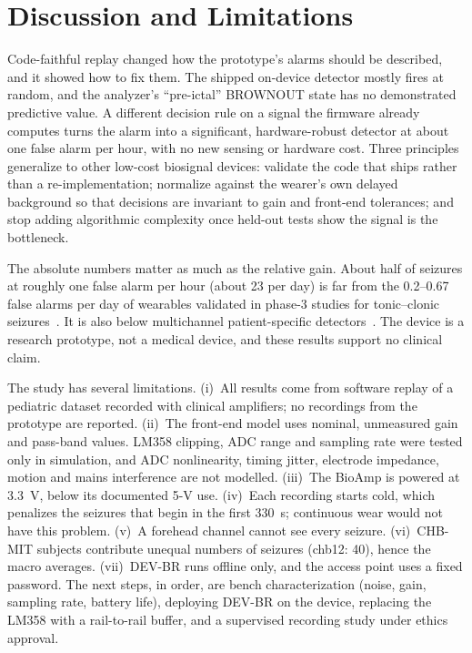 \documentclass[conference,letterpaper]{IEEEtran}
\begin{document}
\section{Discussion and Limitations}
Code-faithful replay changed how the prototype's alarms should be described, and it showed how to fix them. The shipped on-device detector mostly fires at random, and the analyzer's ``pre-ictal'' BROWNOUT state has no demonstrated predictive value. A different decision rule on a signal the firmware already computes turns the alarm into a significant, hardware-robust detector at about one false alarm per hour, with no new sensing or hardware cost. Three principles generalize to other low-cost biosignal devices: validate the code that ships rather than a re-implementation; normalize against the wearer's own delayed background so that decisions are invariant to gain and front-end tolerances; and stop adding algorithmic complexity once held-out tests show the signal is the bottleneck.

The absolute numbers matter as much as the relative gain. About half of seizures at roughly one false alarm per hour (about 23 per day) is far from the 0.2--0.67 false alarms per day of wearables validated in phase-3 studies for tonic--clonic seizures~\cite{beniczky2021guideline}. It is also below multichannel patient-specific detectors~\cite{shoeb2010icml}. The device is a research prototype, not a medical device, and these results support no clinical claim.

The study has several limitations. (i)~All results come from software replay of a pediatric dataset recorded with clinical amplifiers; no recordings from the prototype are reported. (ii)~The front-end model uses nominal, unmeasured gain and pass-band values. LM358 clipping, ADC range and sampling rate were tested only in simulation, and ADC nonlinearity, timing jitter, electrode impedance, motion and mains interference are not modelled. (iii)~The BioAmp is powered at 3.3~V, below its documented 5-V use. (iv)~Each recording starts cold, which penalizes the \NColdStart{} seizures that begin in the first 330~s; continuous wear would not have this problem. (v)~A forehead channel cannot see every seizure. (vi)~CHB-MIT subjects contribute unequal numbers of seizures (chb12: 40), hence the macro averages. (vii)~DEV-BR runs offline only, and the access point uses a fixed password. The next steps, in order, are bench characterization (noise, gain, sampling rate, battery life), deploying DEV-BR on the device, replacing the LM358 with a rail-to-rail buffer, and a supervised recording study under ethics approval.
\end{document}
